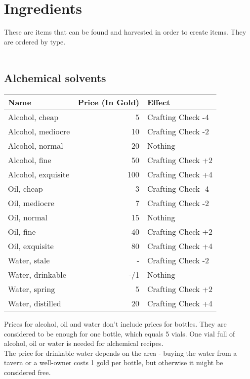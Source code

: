 \section{Ingredients}\label{sec:ingredients}
These are items that can be found and harvested in order to create items.
They are ordered by type.\\
\\

\subsection{Alchemical solvents}\label{subsec:solvents}
\begin{longtable}{l | r | l}
	Name & Price (In Gold) & Effect\\ \hline
	Alcohol, cheap & 5 & Crafting Check -4\\
	Alcohol, mediocre & 10 & Crafting Check -2\\
	Alcohol, normal & 20 & Nothing\\
	Alcohol, fine & 50 & Crafting Check +2\\
	Alcohol, exquisite & 100 & Crafting Check +4\\
	Oil, cheap & 3 & Crafting Check -4\\
	Oil, mediocre & 7 & Crafting Check -2\\
	Oil, normal & 15 & Nothing\\
	Oil, fine & 40 & Crafting Check +2\\
	Oil, exquisite & 80 & Crafting Check +4\\
	Water, stale & - & Crafting Check -2\\
	Water, drinkable & -/1 & Nothing\\
	Water, spring & 5 & Crafting Check +2\\
	Water, distilled & 20 & Crafting Check +4\\
\end{longtable}

Prices for alcohol, oil and water don't include prices for bottles.
They are considered to be enough for one bottle, which equals 5 vials.
One vial full of alcohol, oil or water is needed for alchemical recipes. \\

The price for drinkable water depends on the area - buying the water from a tavern or a well-owner costs 1 gold per bottle, but otherwise it might be considered free.\\


